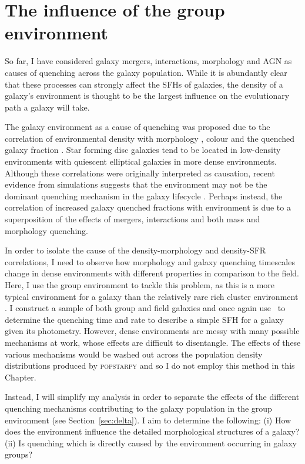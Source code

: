 \chapter{The influence of the group environment}\label{chap:env}
 
So far, I have considered  galaxy mergers, interactions, morphology and AGN as causes of quenching across the galaxy population. While it is abundantly clear that these processes can strongly affect the SFHs of galaxies, the density of a galaxy's environment is thought to be the largest influence on the evolutionary path a galaxy will take. 
 
 The galaxy environment as a cause of quenching was proposed due to the correlation of environmental density with morphology \citep{dressler80, smail97, poggianti99, postman05, Bamford09}, colour \citep{butcher78, pimbblet02} and the quenched galaxy fraction \citep{kauffmann03, Baldry06, peng12, darvish16}. Star forming disc galaxies tend to be located in low-density environments with quiescent elliptical galaxies in more dense environments. Although these correlations were originally interpreted as causation, recent evidence from simulations suggests that the environment may not be the dominant quenching mechanism in the galaxy lifecycle \citep{kimm09, kimm11, hirschmann14, wang14, phillips15}. Perhaps instead, the correlation of increased galaxy quenched fractions with environment is due to a superposition of the effects of mergers, interactions and both mass and morphology quenching. 
  
In order to isolate the cause of the density-morphology and density-SFR correlations, I need to observe how morphology and galaxy quenching timescales change in dense environments with different properties in comparison to the field. Here, I use the group environment to tackle this problem, as this is a more typical environment for a galaxy than the relatively rare rich cluster environment \citep{carlberg04}. I construct a sample of both group and field galaxies and once again use \starpy\ to determine the quenching time and rate to describe a simple SFH for a galaxy given its photometry. However, dense environments are messy with many possible mechanisms at work, whose effects are difficult to disentangle. The effects of these various mechanisms would be washed out across the population density distributions produced by \textsc{popstarpy} and so I do not employ this method in this Chapter. 

Instead, I will simplify my analysis in order to separate the effects of the different quenching mechanisms contributing to the galaxy population in the group environment (see Section~\ref{sec:delta}). I aim to determine the following: (i) How does the environment influence the detailed morphological structures of a galaxy?  (ii) Is quenching which is directly caused by the environment occurring in galaxy groups?
 
